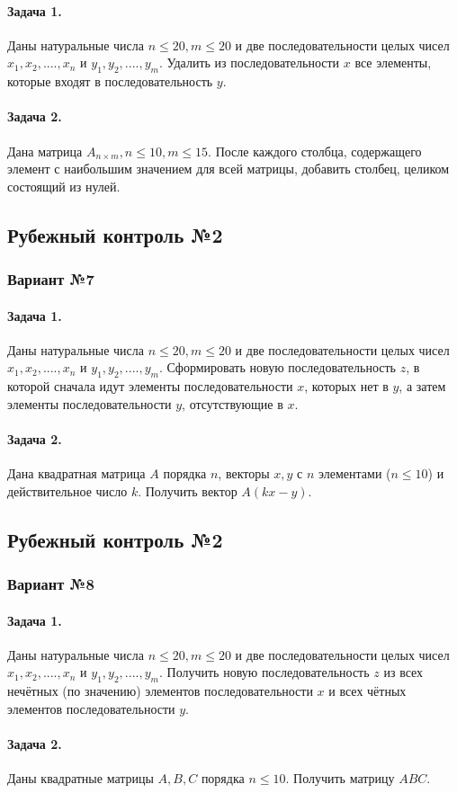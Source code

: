 \documentclass[12pt,a4paper]{report}
\begin{document}
\paragraph*{Задача 1.} Даны натуральные числа $n \le 20, m \le 20$ и две последовательности целых чисел $x_1, x_2, ...., x_n$ и $y_1, y_2, ...., y_m$. Удалить из последовательности $x$ все элементы, которые входят в последовательность $y$.
\paragraph*{Задача 2.} Дана матрица $A_{n \times m}, n \le 10, m \le 15$. После каждого столбца, содержащего элемент с наибольшим значением для всей матрицы, добавить столбец, целиком состоящий из нулей.

\subsection*{Рубежный контроль №2}
\subsubsection*{Вариант №7}
\paragraph*{Задача 1.} Даны натуральные числа $n \le 20, m \le 20$ и две последовательности целых чисел $x_1, x_2, ...., x_n$ и $y_1, y_2, ...., y_m$. Сформировать новую последовательность $z$, в которой сначала идут элементы последовательности $x$, которых нет в $y$, а затем элементы последовательности $y$, отсутствующие в $x$.
\paragraph*{Задача 2.} Дана квадратная матрица $A$ порядка $n$, векторы $x, y$ с $n$ элементами ($n \le 10$) и действительное число $k$. Получить вектор $A(kx-y)$.

\subsection*{Рубежный контроль №2}
\subsubsection*{Вариант №8}
\paragraph*{Задача 1.} Даны натуральные числа $n \le 20, m \le 20$ и две последовательности целых чисел $x_1, x_2, ...., x_n$ и $y_1, y_2, ...., y_m$. Получить новую последовательность $z$ из всех нечётных (по значению) элементов последовательности $x$ и всех чётных элементов последовательности $y$.
\paragraph*{Задача 2.} Даны квадратные матрицы $A, B, C$ порядка $n \le 10$. Получить матрицу $ABC$.
\end{document}
